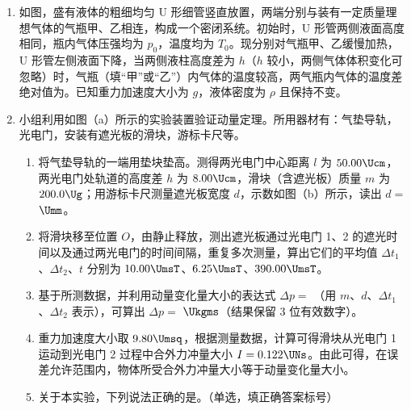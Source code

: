 \documentclass[\gkver]{gaokaozhenti}
\begin{document}
\begin{enumerate}
\item
如图，盛有液体的粗细均匀 U 形细管竖直放置，两端分别与装有一定质量理想气体的气瓶甲、乙相连，构成一个密闭系统。初始时，U 形管两侧液面高度相同，瓶内气体压强均为 $p_0$，温度均为 $T_0$。现分别对气瓶甲、乙缓慢加热，U 形管左侧液面下降，当两侧液柱高度差为 $h$（$h$ 较小，两侧气体体积变化可忽略）时，气瓶（填“甲”或“乙”）内气体的温度较高，两气瓶内气体的温度差绝对值为。已知重力加速度大小为 $g$，液体密度为 $\rho$ 且保持不变。

\item
小组利用如图（a）所示的实验装置验证动量定理。所用器材有：气垫导轨，光电门，安装有遮光板的滑块，游标卡尺等。
\begin{enumerate}
	\item
	将气垫导轨的一端用垫块垫高。测得两光电门中心距离 $l$ 为 $50.00\Ucm$，两光电门处轨道的高度差 $h$ 为 $8.00\Ucm$，滑块（含遮光板）质量 $m$ 为 $200.0\Ug$；用游标卡尺测量遮光板宽度 $d$，示数如图（b）所示，读出 $d=$ $\Umm$。
	\item
	将滑块移至位置 $O$，由静止释放，测出遮光板通过光电门 1、2 的遮光时间以及通过两光电门的时间间隔，重复多次测量，算出它们的平均值 $\Delta t_1$、$\Delta t_2$、$t$ 分别为 $10.00\UmsT$、$6.25\UmsT$、$390.00\UmsT$。
	\item
	基于所测数据，并利用动量变化量大小的表达式 $\Delta p=$ （用 $m$、$d$、$\Delta t_1$、$\Delta t_2$ 表示），可算出 $\Delta p=$ $\Ukgms$（结果保留 3 位有效数字）。
	\item
	重力加速度大小取 $9.80\Umsq$，根据测量数据，计算可得滑块从光电门 1 运动到光电门 2 过程中合外力冲量大小 $I=0.122\UNs$。由此可得，在误差允许范围内，物体所受合外力冲量大小等于动量变化量大小。
	\item
	关于本实验，下列说法正确的是。（单选，填正确答案标号）


\end{enumerate}
\end{enumerate}
\end{document}
